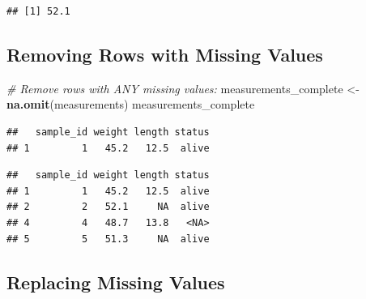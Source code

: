 \documentclass[
]{article}
\newenvironment{Shaded}{\begin{snugshade}}{\end{snugshade}}
\newcommand{\CommentTok}[1]{\textcolor[rgb]{0.56,0.35,0.01}{\textit{#1}}}
\newcommand{\FunctionTok}[1]{\textcolor[rgb]{0.13,0.29,0.53}{\textbf{#1}}}
\newcommand{\NormalTok}[1]{#1}
\newcommand{\OtherTok}[1]{\textcolor[rgb]{0.56,0.35,0.01}{#1}}
\newcommand{\SpecialCharTok}[1]{\textcolor[rgb]{0.81,0.36,0.00}{\textbf{#1}}}
\begin{document}
\begin{verbatim}
## [1] 52.1
\end{verbatim}

\subsection{Removing Rows with Missing
Values}\label{removing-rows-with-missing-values}

\begin{Shaded}
\begin{Highlighting}[]
\CommentTok{\# Remove rows with ANY missing values:}
\NormalTok{measurements\_complete }\OtherTok{\textless{}{-}} \FunctionTok{na.omit}\NormalTok{(measurements)}
\NormalTok{measurements\_complete   }
\end{Highlighting}
\end{Shaded}

\begin{verbatim}
##   sample_id weight length status
## 1         1   45.2   12.5  alive
\end{verbatim}

\begin{Shaded}
\end{Shaded}

\begin{verbatim}
##   sample_id weight length status
## 1         1   45.2   12.5  alive
## 2         2   52.1     NA  alive
## 4         4   48.7   13.8   <NA>
## 5         5   51.3     NA  alive
\end{verbatim}

\subsection{Replacing Missing Values}\label{replacing-missing-values}
\end{document}
